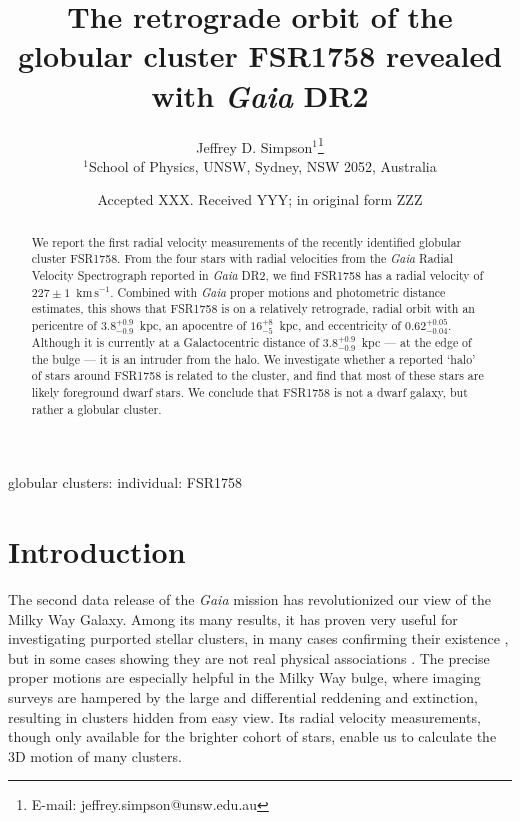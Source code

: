 \documentclass[fleqn,usenatbib]{mnras}
\title[The orbit of FSR1758]{The retrograde orbit of the globular cluster FSR1758 revealed with \textit{Gaia} DR2}
\author[Simpson]{
Jeffrey D. Simpson$^{1}$\thanks{E-mail: jeffrey.simpson@unsw.edu.au}
\\
$^{1}$School of Physics, UNSW, Sydney, NSW 2052, Australia
}
\date{Accepted XXX. Received YYY; in original form ZZZ}
\newcommand{\kms}{~\ensuremath{\textrm{km}\,\textrm{s}^{-1}}}
\begin{document}
\label{firstpage}
\pagerange{\pageref{firstpage}--\pageref{lastpage}}
\maketitle

\begin{abstract}
We report the first radial velocity measurements of the recently identified globular cluster FSR1758. From the four stars with radial velocities from the \textit{Gaia} Radial Velocity Spectrograph reported in \textit{Gaia} DR2, we find FSR1758 has a radial velocity of $227\pm1$\kms. Combined with \textit{Gaia} proper motions and photometric distance estimates, this shows that FSR1758 is on a relatively retrograde, radial orbit with an pericentre of $3.8_{-0.9}^{+0.9}$~kpc, an apocentre of $16_{-5}^{+8}$~kpc, and eccentricity of $0.62_{-0.04}^{+0.05}$. Although it is currently at a Galactocentric distance of $3.8_{-0.9}^{+0.9}$~kpc --- at the edge of the bulge --- it is an intruder from the halo. We investigate whether a reported `halo' of stars around FSR1758 is related to the cluster, and find that most of these stars are likely foreground dwarf stars. We conclude that FSR1758 is not a dwarf galaxy, but rather a globular cluster.
\end{abstract}

\begin{keywords}
globular clusters: individual: FSR1758
\end{keywords}



\section{Introduction} \label{sec:intro}
The second data release of the \textit{Gaia} mission \citep{GaiaCollaboration:2018io} has revolutionized our view of the Milky Way Galaxy. Among its many results, it has proven very useful for investigating purported stellar clusters, in many cases confirming their existence \citep[e.g.,][]{Simpson:2017ex,Soubiran2018,Cantat-Gaudin2018}, but in some cases showing they are not real physical associations \citep[e.g.,][]{Kos:2018we}. The precise proper motions are especially helpful in the Milky Way bulge, where imaging surveys are hampered by the large and differential reddening and extinction, resulting in clusters hidden from easy view. Its radial velocity measurements, though only available for the brighter cohort of stars, enable us to calculate the 3D motion of many clusters.
\end{document}
